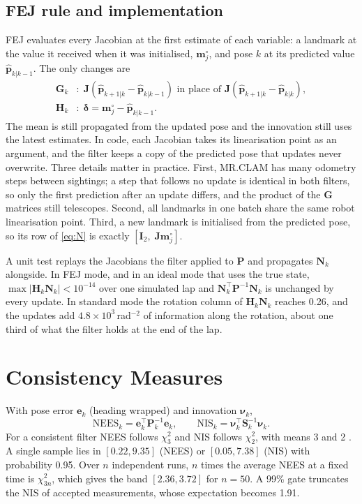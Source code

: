 \documentclass[conference]{IEEEtran}
\newcommand{\vect}[1]{\mathbf{#1}}
\newcommand{\T}{^{\top}}
\begin{document}
\subsection{FEJ rule and implementation}
FEJ evaluates every Jacobian at the first estimate of each variable: a landmark at the value it received when it was initialised, $\vect{m}^{\circ}_j$, and pose $k$ at its predicted value $\hat{\vect{p}}_{k|k-1}$. The only changes are
\begin{align}
\vect{G}_k &: \; \vect{J}(\hat{\vect{p}}_{k+1|k} - \hat{\vect{p}}_{k|k-1}) \text{ in place of } \vect{J}(\hat{\vect{p}}_{k+1|k} - \hat{\vect{p}}_{k|k}),\\
\vect{H}_k &: \; \boldsymbol{\delta} = \vect{m}^{\circ}_j - \hat{\vect{p}}_{k|k-1}.
\end{align}
The mean is still propagated from the updated pose and the innovation still uses the latest estimates. In code, each Jacobian takes its linearisation point as an argument, and the filter keeps a copy of the predicted pose that updates never overwrite. Three details matter in practice. First, MR.CLAM has many odometry steps between sightings; a step that follows no update is identical in both filters, so only the first prediction after an update differs, and the product of the $\vect{G}$ matrices still telescopes. Second, all landmarks in one batch share the same robot linearisation point. Third, a new landmark is initialised from the predicted pose, so its row of \eqref{eq:N} is exactly $[\vect{I}_2,\; \vect{J}\vect{m}^{\circ}_j]$.

A unit test replays the Jacobians the filter applied to $\vect{P}$ and propagates $\vect{N}_k$ alongside. In FEJ mode, and in an ideal mode that uses the true state, $\max|\vect{H}_k\vect{N}_k| < 10^{-14}$ over one simulated lap and $\vect{N}_k\T\vect{P}^{-1}\vect{N}_k$ is unchanged by every update. In standard mode the rotation column of $\vect{H}_k\vect{N}_k$ reaches 0.26, and the updates add $4.8\times10^{3}$\,rad$^{-2}$ of information along the rotation, about one third of what the filter holds at the end of the lap.

\section{Consistency Measures}
With pose error $\vect{e}_k$ (heading wrapped) and innovation $\boldsymbol{\nu}_k$,
\begin{equation}
\mathrm{NEES}_k = \vect{e}_k\T\vect{P}_k^{-1}\vect{e}_k,\qquad \mathrm{NIS}_k = \boldsymbol{\nu}_k\T\vect{S}_k^{-1}\boldsymbol{\nu}_k .
\end{equation}
For a consistent filter NEES follows $\chi^2_3$ and NIS follows $\chi^2_2$, with means 3 and 2 \cite{barshalom2001}. A single sample lies in $[0.22, 9.35]$ (NEES) or $[0.05, 7.38]$ (NIS) with probability 0.95. Over $n$ independent runs, $n$ times the average NEES at a fixed time is $\chi^2_{3n}$, which gives the band $[2.36, 3.72]$ for $n = 50$. A 99\% gate truncates the NIS of accepted measurements, whose expectation becomes 1.91.
\end{document}
